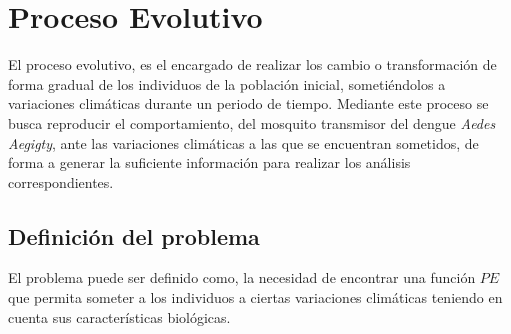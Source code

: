 \section{Proceso Evolutivo}
El proceso evolutivo, es el encargado de realizar los cambio o transformación
de forma gradual de los individuos de la población inicial, sometiéndolos a
variaciones climáticas durante un periodo de tiempo. Mediante este proceso se 
busca reproducir el comportamiento, del mosquito transmisor del dengue \textit{Aedes Aegigty}, 
ante las variaciones climáticas a las que se encuentran sometidos, de forma a
generar la suficiente información para realizar los análisis correspondientes.

\subsection{Definición del problema}

El problema puede ser definido como, la necesidad de encontrar una función $PE$ que permita someter a los
individuos a ciertas variaciones climáticas teniendo en cuenta sus características biológicas.

